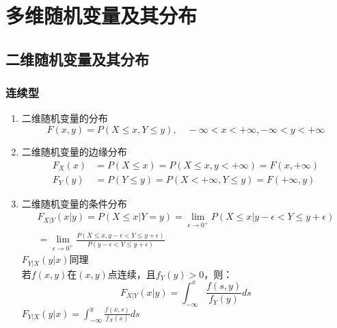 \section{多维随机变量及其分布}
\subsection{二维随机变量及其分布}
\subsubsection{连续型}
\begin{enumerate}
	\item 二维随机变量的分布
	\begin{equation}
		F(x, y) = P(X\leq x, Y \leq y), \quad -\infty < x < +\infty, -\infty < y < + \infty
	\end{equation}

	\item 二维随机变量的边缘分布
	\begin{equation}\begin{aligned}
			F_X(x) &= P(X\leq x) = P(X\leq x, y< +\infty) = F(x, +\infty) \\
			F_Y(y) &= P(Y\leq y) = P(X< +\infty, Y\leq y) = F(+\infty, y)
	\end{aligned}\end{equation}
	\item 二维随机变量的条件分布
	\begin{align}
		F_{X|Y}(x|y) = P(X \leq x | Y=y) 
		= \lim_{\epsilon \to 0^+}P(X \leq x | y - \epsilon < Y \leq y + \epsilon) \\
		= \lim_{\epsilon \to 0^+} \frac{P(X \leq x, y - \epsilon < Y \leq y + \epsilon)}{P(y - \epsilon < Y \leq y + \epsilon)}
	\end{align}
	$F_{Y|X}(y|x)$同理 \\
	若$f(x,y)$在$(x,y)$点连续，且$f_Y(y)>0$，则：
	\begin{equation}
		F_{X|Y}(x|y) = \int_{-\infty}^{x}\frac{f(s,y)}{f_Y(y)}ds
	\end{equation}
	$F_{Y|X}(y|x)=\int_{-\infty}^{y}\frac{f(x,s)}{f_X(x)}ds$

\end{enumerate}

